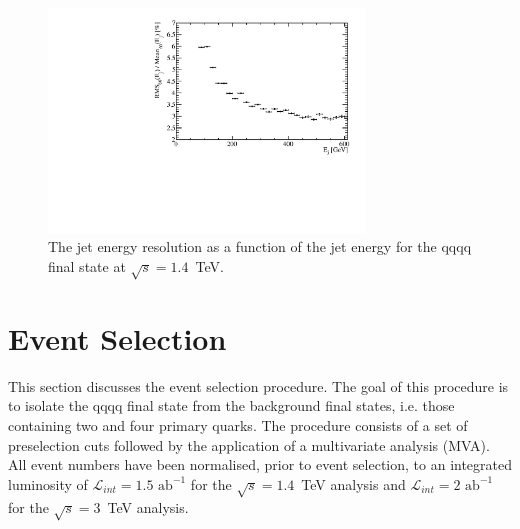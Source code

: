 \begin{figure}
\centering
\includegraphics[width=0.75\textwidth]{PhysicsAnalysis/Plots/JetEnergyResolution/JetEnergyResolutionScan_1400GeV.pdf}
\caption[The jet energy resolution as a function of the jet energy for the {\nu}{\nu}qqqq final state at $\sqrt{s}=1.4$~TeV.]{The jet energy resolution as a function of the jet energy for the {\nu}{\nu}qqqq final state at $\sqrt{s}=1.4$~TeV.}
\label{fig:jeteenrgyresolutionphysicsanalysis}
\end{figure}


\section{Event Selection}
\label{sec:eventselection}
This section discusses the event selection procedure.  The goal of this procedure is to isolate the \nu{\nu}qqqq final state from the background final states, i.e. those containing two and four primary quarks.  The procedure consists of a set of preselection cuts followed by the application of a multivariate analysis (MVA).  All event numbers  have been normalised, prior to event selection, to an integrated luminosity of $\mathcal{L}_{int} = 1.5\text{ ab}^{-1}$ for the $\sqrt{s} = 1.4$~TeV analysis and $\mathcal{L}_{int} = 2\text{ ab}^{-1}$  for the $\sqrt{s} = 3$~TeV analysis.  


